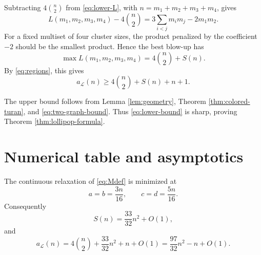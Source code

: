 \documentclass[12pt]{article}
\theoremstyle{plain}
\theoremstyle{definition}
\theoremstyle{remark}
\newcommand{\Lop}{\mathcal L}
\begin{document}
Subtracting \(4\binom n2\) from \eqref{eq:lower-L}, with
\(n=m_1+m_2+m_3+m_4\), gives
\[
  L(m_1,m_2,m_3,m_4)-4\binom n2
  =3\sum_{i<j}m_i m_j-2m_1m_2.
\]
For a fixed multiset of four cluster sizes, the product penalized by the
coefficient \(-2\) should be the smallest product.  Hence the best blow-up has
\[
  \max L(m_1,m_2,m_3,m_4)=4\binom n2+S(n).
\]
By \eqref{eq:regions}, this gives
\begin{equation}\label{eq:lower-bound}
  a_{\Lop}(n)\ge4\binom n2+S(n)+n+1.
\end{equation}

The upper bound follows from Lemma \ref{lem:geometry}, Theorem
\ref{thm:colored-turan}, and \eqref{eq:two-graph-bound}.  Thus
\eqref{eq:lower-bound} is sharp, proving Theorem \ref{thm:lollipop-formula}.

\section{Numerical table and asymptotics}

The continuous relaxation of \eqref{eq:Mdef} is minimized at
\[
  a=b=\frac{3n}{16},\qquad c=d=\frac{5n}{16}.
\]
Consequently
\[
  S(n)=\frac{33}{32}n^2+O(1),
\]
and
\[
  a_{\Lop}(n)=4\binom n2+\frac{33}{32}n^2+n+O(1)
  =\frac{97}{32}n^2-n+O(1).
\]
\end{document}
